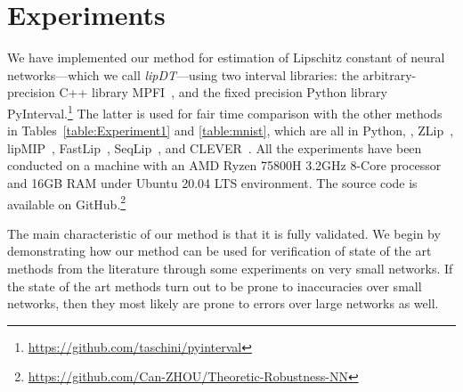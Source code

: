 \documentclass[11pt,times]{article}
\begin{document}



\section{Experiments}
\label{sec:experiments}





We have implemented our method for estimation of Lipschitz constant of
neural networks---which we call \emph{lipDT}---using two interval
libraries: the arbitrary-precision C++ library
MPFI~\parencite{Revol_Rouillier:MPFI:05}, and the fixed precision
Python library
PyInterval.\footnote{\url{https://github.com/taschini/pyinterval}} The
latter is used for fair time comparison with the other methods in
Tables~\ref{table:Experiment1} and \ref{table:mnist}, which are all in
Python, {\ie}, ZLip~\parencite{Jordan_Dimakis:Provable_ICML:2021},
lipMIP~\parencite{Jordan_Dimakis:Exactly_NeurIPS:2020},
FastLip~\parencite{Weng_et_al:Towards_FastLip:2018},
SeqLip~\parencite{Virmaux_Scaman:Lipschitz_regularity:2018}, and
\ac{CLEVER}~\parencite{Weng_et_al-CLEVER-ICLR:2018}. All the
experiments have been conducted on a machine with an AMD Ryzen 75800H
3.2GHz 8-Core processor and 16GB RAM under Ubuntu 20.04 LTS
environment. The source code is available on
GitHub.\footnote{\url{https://github.com/Can-ZHOU/Theoretic-Robustness-NN}}

The main characteristic of our method is that it is fully
validated. We begin by demonstrating how our method can be used for
verification of state of the art methods from the literature through
some experiments on very small networks. If the state of the art
methods turn out to be prone to inaccuracies over small networks, then
they most likely are prone to errors over large networks as well.
\end{document}

